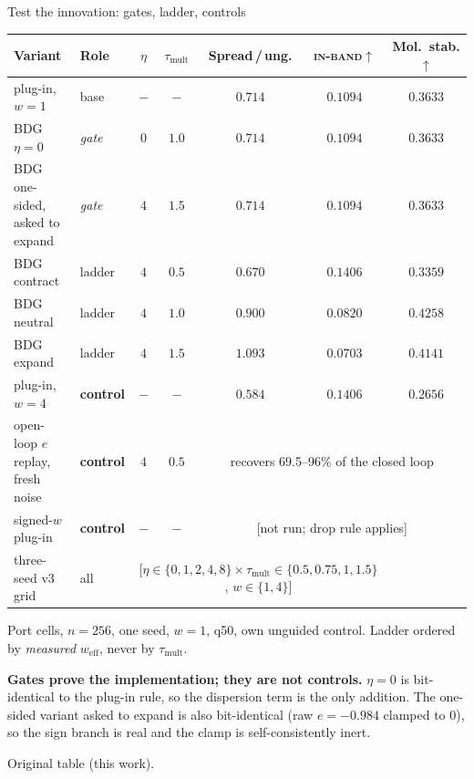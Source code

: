 \documentclass[aspectratio=169,10pt]{beamer}
\newcommand{\theslidelabel}{}
\newcommand{\lbl}[1]{\renewcommand{\theslidelabel}{#1}}
\newcommand{\srcs}[1]{\vfill{\raggedleft\color{grayt}\fontsize{4.9}{5.6}\selectfont #1\par}}
\newcommand{\TODO}[1]{\textcolor{accent}{\scriptsize[#1]}}
\newcommand{\weff}{w_{\mathrm{eff}}}
\newcommand{\ib}{\textsc{in-band}}
\begin{document}
\lbl{2d}
\begin{frame}{Test the innovation: gates, ladder, controls}
  \centering
  {\small
  \begin{tabular}{llccccc}
    \toprule
    Variant & Role & $\eta$ & $\tau_{\mathrm{mult}}$ & Spread\,/\,ung. & \ib$\uparrow$ & Mol.\ stab.$\uparrow$ \\
    \midrule
    plug-in, $w{=}1$ & base & $-$ & $-$ & $0.714$ & $0.1094$ & $0.3633$ \\
    BDG $\eta{=}0$ & \emph{gate} & $0$ & $1.0$ & $0.714$ & $0.1094$ & $0.3633$ \\
    BDG one-sided, asked to expand & \emph{gate} & $4$ & $1.5$ & $0.714$ & $0.1094$ & $0.3633$ \\
    \midrule
    BDG contract & ladder & $4$ & $0.5$ & $0.670$ & $0.1406$ & $0.3359$ \\
    BDG neutral & ladder & $4$ & $1.0$ & $0.900$ & $0.0820$ & $0.4258$ \\
    BDG expand & ladder & $4$ & $1.5$ & $1.093$ & $0.0703$ & $0.4141$ \\
    \midrule
    plug-in, $w{=}4$ & \textbf{control} & $-$ & $-$ & $0.584$ & $0.1406$ & $0.2656$ \\
    open-loop $e$ replay, fresh noise & \textbf{control} & $4$ & $0.5$ & \multicolumn{3}{c}{recovers 69.5--96\% of the closed loop} \\
    signed-$w$ plug-in & \textbf{control} & $-$ & $-$ & \multicolumn{3}{c}{\TODO{not run; drop rule applies}} \\
    three-seed v3 grid & all & \multicolumn{4}{c}{\TODO{$\eta\in\{0,1,2,4,8\}\times\tau_{\mathrm{mult}}\in\{0.5,0.75,1,1.5\}$, $w\in\{1,4\}$}} \\
    \bottomrule
  \end{tabular}}

  \smallskip
  {\scriptsize Port cells, $n{=}256$, one seed, $w{=}1$, q50, own unguided control.
  Ladder ordered by \emph{measured} $\weff$, never by $\tau_{\mathrm{mult}}$.}

  \medskip
  \raggedright
  \textbf{Gates prove the implementation; they are not controls.} $\eta=0$ is
  bit-identical to the plug-in rule, so the dispersion term is the only addition. The
  one-sided variant asked to expand is also bit-identical (raw $e=-0.984$ clamped to
  $0$), so the sign branch is real and the clamp is self-consistently inert.

  \srcs{Original table (this work).}
\end{frame}
\end{document}
